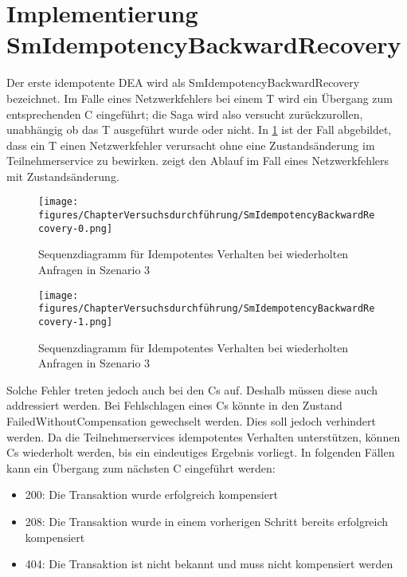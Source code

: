 \section{Implementierung SmIdempotencyBackwardRecovery}
Der erste idempotente DEA wird als SmIdempotencyBackwardRecovery bezeichnet. Im Falle eines Netzwerkfehlers bei einem T wird ein Übergang zum entsprechenden C eingeführt; die Saga wird also versucht zurückzurollen, unabhängig ob das T ausgeführt wurde oder nicht. In \cref{fig:fig_sm_idempotency_backward_recovery_testcase2} ist der Fall abgebildet, dass ein T einen Netzwerkfehler verursacht ohne eine Zustandsänderung im Teilnehmerservice zu bewirken.  zeigt den Ablauf im Fall eines Netzwerkfehlers mit Zustandsänderung. 

\begin{figure}[h!]
	\centering
	\texttt{[image: figures/ChapterVersuchsdurchführung/SmIdempotencyBackwardRecovery-0.png]}
	\caption{Sequenzdiagramm für Idempotentes Verhalten bei wiederholten Anfragen in Szenario 3}
	\label{fig:fig_sm_idempotency_backward_recovery_testcase2}
\end{figure}

\FloatBarrier
\begin{figure}[h!]
	\centering
	\texttt{[image: figures/ChapterVersuchsdurchführung/SmIdempotencyBackwardRecovery-1.png]}
	\caption{Sequenzdiagramm für Idempotentes Verhalten bei wiederholten Anfragen in Szenario 3}
	\label{fig:fig_sm_idempotency_backward_recovery_testcase3}
\end{figure}
\FloatBarrier

Solche Fehler treten jedoch auch bei den Cs auf. Deshalb müssen diese auch addressiert werden. Bei Fehlschlagen eines Cs könnte in den Zustand FailedWithoutCompensation gewechselt werden. Dies soll jedoch verhindert werden. Da die Teilnehmerservices idempotentes Verhalten unterstützen, können Cs wiederholt werden, bis ein eindeutiges Ergebnis vorliegt. In folgenden Fällen kann ein Übergang zum nächsten C eingeführt werden:
\begin{itemize}
	\item 200: Die Transaktion wurde erfolgreich kompensiert
	\item 208: Die Transaktion wurde in einem vorherigen Schritt bereits erfolgreich kompensiert
	\item 404: Die Transaktion ist nicht bekannt und muss nicht kompensiert werden
\end{itemize}


